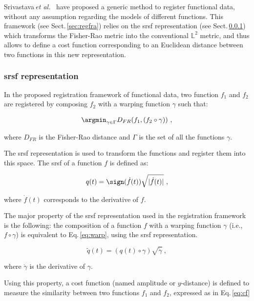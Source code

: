 Srivastava\,\textit{et al.}~\cite{Srivastava2011} have proposed a generic method to register functional data, without any assumption regarding the models of different functions. 
This framework (see Sect.\,\ref{sec:regfra}) relies on the \ac{srsf} representation (see Sect.\,\ref{sec:srsf}) which transforms the Fisher-Rao metric into the conventional $\mathbb{L}^2$ metric, and thus allows to define a cost function corresponding to an Euclidean distance between two functions in this new representation.

\subsubsection{\acl*{srsf} representation} \label{sec:srsf}

In the proposed registration framework of functional data, two function $f_1$ and $f_2$ are registered by composing $f_2$ with a warping function $\gamma$ such that:

\begin{equation}
  \argmin_{\gamma \in \Gamma} D_{FR}(f_1, (f_2 \circ \gamma)) \ ,
  \label{eq:regfun}
\end{equation}

\noindent where $D_{FR}$ is the Fisher-Rao distance and $\Gamma$ is the set of all the functions $\gamma$.

The \Ac{srsf} representation is used to transform the functions and register them into this space. The \ac{srsf} of a function $f$ is defined as:

\begin{equation}
  q(t) = \sign(\dot{f}(t))\sqrt{|\dot{f}(t)|} \ ,
  \label{eq:srsf}
\end{equation}

\noindent where $\dot{f}(t)$ corresponds to the derivative of $f$.

The major property of the \ac{srsf} representation used in the registration framework is the following: the composition of a function $f$ with a warping function $\gamma$ (i.e., $f \circ \gamma$) is equivalent to Eq.\,\eqref{eq:warp}, using the \ac{srsf} representation.

\begin{equation}
  \tilde{q}(t) = (q(t) \circ \gamma) \sqrt{\dot{\gamma}} \ ,
  \label{eq:warp}
\end{equation}

\noindent where $\dot{\gamma}$ is the derivative of $\gamma$.

Using this property, a cost function (named amplitude or $y$-distance) is defined to measure the similarity between two functions $f_1$ and $f_2$, expressed as in Eq.\,\eqref{eq:cf}

